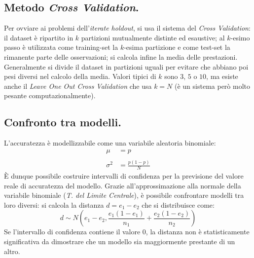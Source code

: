 \documentclass[11pt, a4page, twocolumn]{article}
\begin{document}
\subsection{Metodo \textit{Cross Validation}.}
Per ovviare ai problemi dell'\textit{iterate holdout}, si usa il sistema del \textit{Cross Validation}: il dataset è ripartito in $k$ partizioni mutualmente distinte ed esaustive; al $k$-esimo passo è utilizzata come training-set la $k$-esima partizione e come test-set la rimanente parte delle osservazioni; si calcola infine la media delle prestazioni.
Generalmente si divide il dataset in partizioni uguali per evitare che abbiano poi pesi diversi nel calcolo della media.
Valori tipici di $k$ sono $3$, $5$ o $10$, ma esiste anche il \textit{Leave One Out Cross Validation} che usa $k = N$ (è un sistema però molto pesante computazionalmente).

\subsection{Confronto tra modelli.}
L'accuratezza è modellizzabile come una variabile aleatoria binomiale:
\begin{align*}
  \mu &= p \\ \\
  \sigma^2 &= \frac{p (1 - p)}{N}
\end{align*}
È dunque possibile costruire intervalli di confidenza per la previsione del valore reale di accuratezza del modello.
Grazie all'approssimazione alla normale della variabile binomiale (\textit{T. del Limite Centrale}), è possibile confrontare modelli tra loro diversi: si calcola la distanza $d = e_1 - e_2$ che si distribuisce come:
\begin{equation*}
  d \sim N(e_1 - e_2, \frac{e_1 (1 - e_1)}{n_1} + \frac{e_2 (1 - e_2)}{n_2})
\end{equation*}
Se l'intervallo di confidenza contiene il valore $0$, la distanza non è statisticamente significativa da dimostrare che un modello sia maggiormente prestante di un altro.
\end{document}
